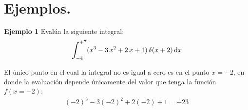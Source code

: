 \documentclass[12pt]{article}
\def\scaleint#1{\vcenter{\hbox{\scaleto[3ex]{\displaystyle\int}{#1}}}}
\def\bs{\mkern-12mu}
\numberwithin{equation}{section}
\begin{document}


\section{Ejemplos.}

\noindent
\textbf{Ejemplo 1} Evalúa la siguiente integral:
\begin{align*}
\scaleint{6ex}_{\bs -4}^{+7} (x^{3} - 3 \, x^{2} + 2 \, x + 1) \, \delta(x + 2) \dd{x}
\end{align*}

El único punto en el cual la integral no es igual a cero es en el punto $x = -2$, en donde la evaluación depende únicamente del valor que tenga la función $f(x = -2)$:
\begin{align*}
(-2)^{3} - 3 (-2)^{2} + 2(-2) + 1 = -23
\end{align*}
\end{document}
